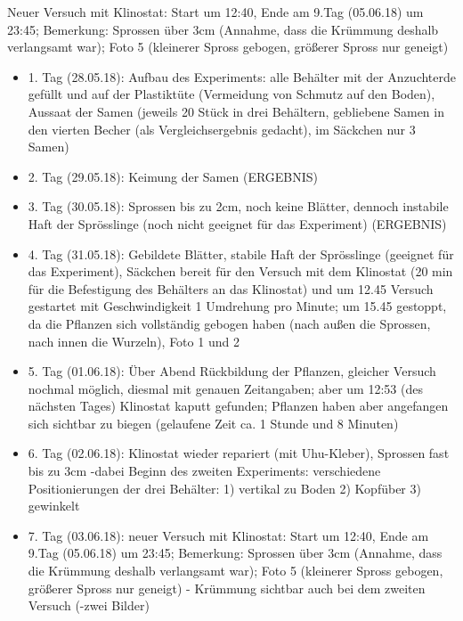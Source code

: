 \documentclass[
a4paper, 
11pt, 
ngerman,
listof=totoc,
bibliography=totocnumbered,
abstracton
]{scrreprt}
\begin{document}
Neuer Versuch mit Klinostat: Start um 12:40, Ende am 9.Tag (05.06.18) um 23:45; Bemerkung: Sprossen über 3cm (Annahme, dass die Krümmung deshalb verlangsamt war); Foto 5 (kleinerer Spross gebogen, größerer Spross nur geneigt)



\begin{itemize}
	\item 1. Tag (28.05.18): Aufbau des Experiments: alle Behälter mit der Anzuchterde gefüllt und auf der Plastiktüte (Vermeidung von Schmutz auf den Boden), Aussaat der Samen (jeweils 20 Stück in drei Behältern, gebliebene Samen in den vierten Becher (als Vergleichsergebnis gedacht), im Säckchen nur 3 Samen)
	
	\item 2. Tag (29.05.18): Keimung der Samen (ERGEBNIS)
	
	\item 3. Tag (30.05.18): Sprossen bis zu 2cm, noch keine Blätter, dennoch instabile Haft der Sprösslinge (noch nicht geeignet für das Experiment) (ERGEBNIS)
	
	\item 4. Tag (31.05.18): Gebildete Blätter, stabile Haft der Sprösslinge (geeignet für das Experiment), Säckchen bereit für den Versuch mit dem Klinostat (20 min für die Befestigung des Behälters an das Klinostat) und um 12.45 Versuch gestartet mit Geschwindigkeit 1 Umdrehung pro Minute; um 15.45 gestoppt, da die Pflanzen sich vollständig gebogen haben (nach außen die Sprossen, nach innen die Wurzeln), Foto 1 und 2
	
	\item 5. Tag (01.06.18): Über Abend Rückbildung der Pflanzen, gleicher Versuch nochmal möglich, diesmal mit genauen Zeitangaben; aber um 12:53 (des nächsten Tages) Klinostat kaputt gefunden; Pflanzen haben aber angefangen sich sichtbar zu biegen (gelaufene Zeit ca. 1 Stunde und 8 Minuten)
	
	\item 6. Tag (02.06.18): Klinostat wieder repariert (mit Uhu-Kleber), Sprossen fast bis zu 3cm  
	-dabei Beginn des zweiten Experiments: verschiedene Positionierungen der drei Behälter: 1) vertikal zu Boden 2) Kopfüber 3) gewinkelt 
	
	\item 7. Tag (03.06.18): neuer Versuch mit Klinostat: Start um 12:40, Ende am 9.Tag (05.06.18) um 23:45; Bemerkung: Sprossen über 3cm (Annahme, dass die Krümmung deshalb verlangsamt war); Foto 5 (kleinerer Spross gebogen, größerer Spross nur geneigt)
	- Krümmung sichtbar auch bei dem zweiten Versuch 
	(-zwei Bilder)
\end{itemize}
\end{document}
